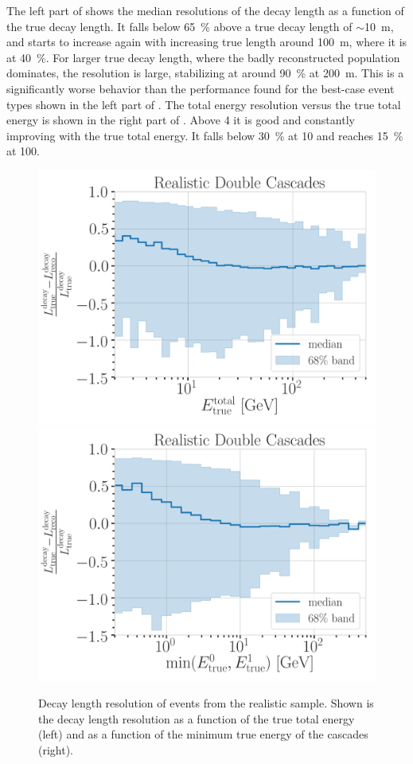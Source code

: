 The left part of  shows the median resolutions of the decay length as a function of the true decay length. It falls below \SI{65}{\percent} above a true decay length of $\sim$\SI{10}{\meter}, and starts to increase again with increasing true length around \SI{100}{\meter}, where it is at \SI{40}{\percent}. For larger true decay length, where the badly reconstructed population dominates, the resolution is large, stabilizing at around \SI{90}{\percent} at \SI{200}{\meter}. This is a significantly worse behavior than the performance found for the best-case event types shown in the left part of . The total energy resolution versus the true total energy is shown in the right part of . Above \SI{4}{\gev} it is good and constantly improving with the true total energy. It falls below \SI{30}{\percent} at \SI{10}{\gev} and reaches \SI{15}{\percent} at \SI{100}{\gev}.

\begin{figure}[h]
	\centering
    \includegraphics[width=0.49\linewidth]{figures/model_independent_simulation/results/realistic/resolutions/194603_median_decay_length_bias_vs_tot_energy_goodfit_log_unweighted.png}
    \includegraphics[width=0.49\linewidth]{figures/model_independent_simulation/results/realistic/resolutions/194603_median_decay_length_bias_vs_min_energy_goodfit_log_unweighted.png} 
    \caption[Realistic double-cascade decay length resolution versus energies]{Decay length resolution of events from the realistic sample. Shown is the decay length resolution as a function of the true total energy (left) and as a function of the minimum true energy of the cascades (right).}
\end{figure}

